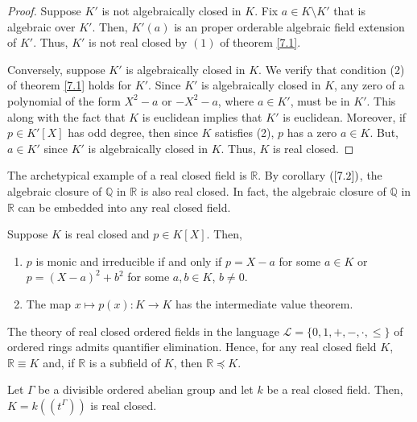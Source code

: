 \begin{proof} Suppose $K'$ is not algebraically closed in $K$.  Fix $a\in K\setminus K'$ that is algebraic over $K'$.  Then, $K'(a)$ is an proper orderable algebraic field extension of $K'$.  Thus, $K'$ is not real closed by $(1)$ of theorem \eqref{7.1}.

Conversely, suppose $K'$ is algebraically closed in $K$.  We verify that condition (2) of theorem \eqref{7.1} holds for $K'$.  Since $K'$ is algebraically closed in $K$, any zero of a polynomial of the form $X^2-a$ or $-X^2-a$, where $a\in K'$, must be in $K'$.  This along with the fact that $K$ is euclidean implies that $K'$ is euclidean.  Moreover, if $p\in K'[X]$ has odd degree, then since $K$ satisfies (2), $p$ has a zero $a\in K$.  But, $a\in K'$ since $K'$ is algebraically closed in $K$.  Thus, $K$ is real closed.  
\end{proof}

The archetypical example of a real closed field is $\mathds{R}$.  By corollary $(\ref{7.2})$, the algebraic closure of $\mathds{Q}$ in $\mathds{R}$ is also real closed.  In fact, the algebraic closure of $\mathds{Q}$ in $\mathds{R}$ can be embedded into any real closed field.

\begin{proposition} Suppose $K$ is real closed and $p\in K[X]$.  Then,
\begin{enumerate}[(1)]
\item $p$ is monic and irreducible if and only if $p=X-a$ for some $a\in K$ or $p=(X-a)^2+b^2$ for some $a, b\in K$, $b\neq 0$. 
\item The map $x\mapsto p(x): K \rightarrow K$ has the intermediate value theorem.  \end{enumerate}\end{proposition}

\begin{theorem}[Tarksi] The theory of real closed ordered fields in the language $\mathcal{L}=\{0, 1, +, -,  \cdot, \leq\}$ of ordered rings admits quantifier elimination.  Hence, for any real closed field $K$, $\mathds{R}\equiv K$ and, if $\mathds{R}$ is a subfield of $K$, then $\mathds{R}\preceq K$.\end{theorem}

\begin{theorem} Let $\Gamma$ be a divisible ordered abelian group and let $k$ be a real closed field.  Then, $K=k((t^\Gamma))$ is real closed. \end{theorem}

